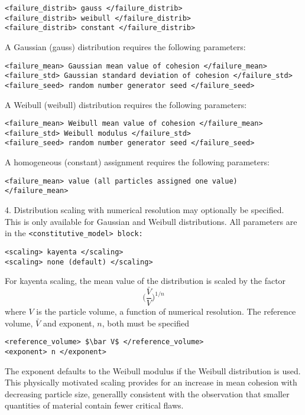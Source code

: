 \begin{enumerate}
\begin{Verbatim}[fontsize=\footnotesize]
<failure_distrib> gauss </failure_distrib>
<failure_distrib> weibull </failure_distrib>
<failure_distrib> constant </failure_distrib>
\end{Verbatim}

A Gaussian (gauss) distribution requires the following parameters:

\begin{Verbatim}[fontsize=\footnotesize]
<failure_mean> Gaussian mean value of cohesion </failure_mean>
<failure_std> Gaussian standard deviation of cohesion </failure_std>
<failure_seed> random number generator seed </failure_seed>
\end{Verbatim}

A Weibull (weibull) distribution requires the following parameters:
\begin{Verbatim}[fontsize=\footnotesize]
<failure_mean> Weibull mean value of cohesion </failure_mean>
<failure_std> Weibull modulus </failure_std>
<failure_seed> random number generator seed </failure_seed>
\end{Verbatim}

A homogeneous (constant) assignment requires the following parameters:
\begin{Verbatim}[fontsize=\footnotesize]
<failure_mean> value (all particles assigned one value) </failure_mean>
\end{Verbatim}

4. Distribution scaling with numerical resolution may optionally be specified.  This is only 
available for Gaussian and Weibull distributions.  All parameters are in the 
\tt <constitutive\_model> \normalfont block:

\begin{Verbatim}[fontsize=\footnotesize]
<scaling> kayenta </scaling>
<scaling> none (default) </scaling>
\end{Verbatim}

For kayenta scaling, the mean value of the distribution is scaled by the factor
\begin{equation}
\biggl(\frac{\bar V}{V}\biggr)^{1/n}
\end{equation}
where $V$ is the particle volume, a function of numerical resolution.  The reference volume, 
$\bar V$ and exponent, $n$, both must be specified
\begin{Verbatim}[fontsize=\footnotesize]
<reference_volume> $\bar V$ </reference_volume>
<exponent> n </exponent>
\end{Verbatim}
The exponent defaults to the Weibull modulus if the Weibull distribution is used.  This physically
motivated scaling provides for an increase in mean cohesion with decreasing particle size, generallly
consistent with the observation that smaller quantities of material contain fewer critical flaws.


\end{enumerate}
